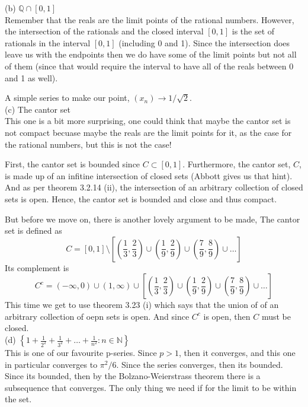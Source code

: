 (b) $\mathbb{Q} \cap [0,1]$
\\

Remember that the reals are the limit points of the rational numbers.
However, the intersection of the rationals and the closed interval $[0,1]$
is the set of rationals in the interval $[0,1]$ (including 0 and 1).
Since the intersection does leave us with the endpoints then we do have some of the limit points
but not all of them (since that would require the interval to have all of the reals between 0 and 1 as well).

A simple series to make our point, $(x_n) \rightarrow 1/\sqrt{2}$.
\\

(c) The cantor set
\\

This one is a bit more surprising, one could think that maybe the cantor set is not compact
becuase maybe the reals are the limit points for it, as the case for the rational numbers, but this is not the case!

First, the cantor set is bounded since $C \subset [0,1]$.
Furthermore, the cantor set, $C$, is made up of an infitine intersection of closed sets (Abbott gives us that hint).
And as per theorem 3.2.14 (ii), the intersection of an arbitrary collection of closed sets is open.
Hence, the cantor set is bounded and close and thus compact.

But before we move on, there is another lovely argument to be made,
The cantor set is defined as
$$
C = [0,1] \setminus 
\left[
    \left(\frac{1}{3}, \frac{2}{3}\right) \cup
    \left(\frac{1}{9}, \frac{2}{9}\right) \cup
    \left(\frac{7}{9}, \frac{8}{9}\right) \cup
    \ldots
\right]
$$
Its complement is
$$
C^c = (-\infty, 0) \cup (1, \infty) \cup
\left[
    \left(\frac{1}{3}, \frac{2}{3}\right) \cup
    \left(\frac{1}{9}, \frac{2}{9}\right) \cup
    \left(\frac{7}{9}, \frac{8}{9}\right) \cup
    \ldots
\right]
$$
This time we get to use theorem 3.23 (i) which says that the union of of an arbitrary collection of oepn sets is open.
And since $C^c$ is open, then $C$ must be closed.
\\

(d) $\left\{ 1 + \frac{1}{2^2} + \frac{1}{3^2} + \ldots + \frac{1}{n^2} : n\in\mathbb{N} \right\}$
\\

This is one of our favourite p-series.
Since $p>1$, then it converges, and this one in particular converges to $\pi^2 / 6$.
Since the series converges, then its bounded.
Since its bounded, then by the Bolzano-Weierstrass theorem there is a subsequence that converges.
The only thing we need if for the limit to be within the set.

